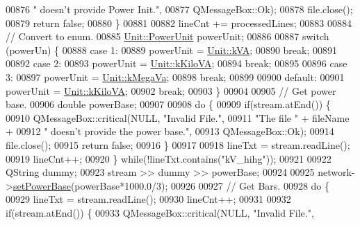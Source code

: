 \begin{DoxyCode}
00876                           \textcolor{stringliteral}{" doesn't provide Power Init."},
00877                           QMessageBox::Ok);
00878     file.close();
00879     \textcolor{keywordflow}{return} \textcolor{keyword}{false};
00880   \}
00881 
00882   lineCnt += processedLines;
00883 
00884   \textcolor{comment}{// Convert to enum.}
00885   \hyperlink{class_unit_ace265ae255370ccacfd5370337572c3b}{Unit::PowerUnit} powerUnit;
00886 
00887   \textcolor{keywordflow}{switch} (powerUn) \{
00888   \textcolor{keywordflow}{case} 1:
00889     powerUnit = \hyperlink{class_unit_ace265ae255370ccacfd5370337572c3ba72b181a842ae2759488a2fa1410d3696}{Unit::kVA};
00890     \textcolor{keywordflow}{break};
00891 
00892   \textcolor{keywordflow}{case} 2:
00893     powerUnit = \hyperlink{class_unit_ace265ae255370ccacfd5370337572c3bac9e5154522fbb810d7aed75c3ff47cb2}{Unit::kKiloVA};
00894     \textcolor{keywordflow}{break};
00895 
00896   \textcolor{keywordflow}{case} 3:
00897     powerUnit = \hyperlink{class_unit_ace265ae255370ccacfd5370337572c3ba6039da0ed20f8bee64305bab8bdec365}{Unit::kMegaVa};
00898     \textcolor{keywordflow}{break};
00899 
00900   \textcolor{keywordflow}{default}:
00901     powerUnit = \hyperlink{class_unit_ace265ae255370ccacfd5370337572c3bac9e5154522fbb810d7aed75c3ff47cb2}{Unit::kKiloVA};
00902     \textcolor{keywordflow}{break};
00903   \}
00904 
00905   \textcolor{comment}{// Get power base.}
00906   \textcolor{keywordtype}{double} powerBase;
00907 
00908   \textcolor{keywordflow}{do} \{
00909     \textcolor{keywordflow}{if}(stream.atEnd()) \{
00910       QMessageBox::critical(NULL, \textcolor{stringliteral}{"Invalid File."},
00911                             \textcolor{stringliteral}{"The file "} + fileName +
00912                             \textcolor{stringliteral}{" doesn't provide the power base."},
00913                             QMessageBox::Ok);
00914       file.close();
00915       \textcolor{keywordflow}{return} \textcolor{keyword}{false};
00916     \}
00917 
00918     lineTxt = stream.readLine();
00919     lineCnt++;
00920   \} \textcolor{keywordflow}{while}(!lineTxt.contains(\textcolor{stringliteral}{"kV\_hihg"}));
00921 
00922   QString dummy;
00923   stream >> dummy >> powerBase;
00924 
00925   network->\hyperlink{group___models_ga3ba9ef05ea0c5037a415cfab25d03a0d}{setPowerBase}(powerBase*1000.0/3);
00926 
00927   \textcolor{comment}{// Get Bars.}
00928   \textcolor{keywordflow}{do} \{
00929     lineTxt = stream.readLine();
00930     lineCnt++;
00931 
00932     \textcolor{keywordflow}{if}(stream.atEnd()) \{
00933       QMessageBox::critical(NULL, \textcolor{stringliteral}{"Invalid File."},

\end{DoxyCode}
